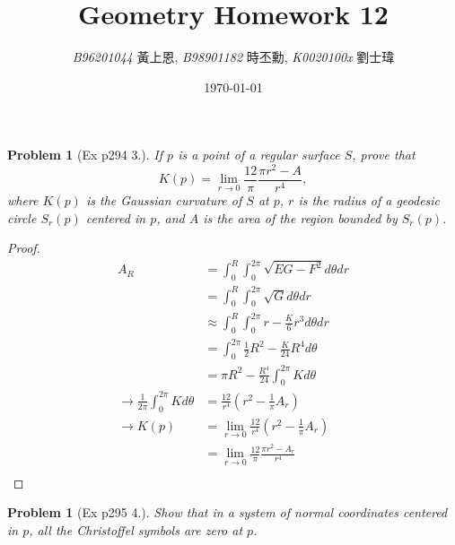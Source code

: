 \documentclass[10pt,a4paper]{article}
\newcommand{\LiHei}{\CJKfamily{lh}}
\newcounter{theProblemCounter}
\newtheorem{problem}[theProblemCounter]{Problem}
\begin{document}
\title{{Geometry Homework 12}}
\author{{\it{B96201044}} {\LiHei 黃上恩}, {\it{B98901182}} {\LiHei 時丕勳}, {\it{K0020100x}} {\LiHei 劉士瑋}}
\date{\today}
\maketitle

\newcommand{\bx}{\mathbb{X}}
\newcommand{\bfx}{\mathbf{x}}
\newcommand{\grad}{\textrm{grad }}
\newcommand{\sech}{\mbox{sech}}
\newcommand{\pr}[2]{\frac{\partial #1}{\partial #2}}
\newcommand{\prr}[3]{\frac{\partial^2 #1}{\partial #2\partial #3}}
\newcommand{\ip}[2]{\left\langle#1, #2\right\rangle}

\setcounter{theProblemCounter}{2}
\begin{problem}[Ex p294 3.]
If $p$ is a point of a regular surface $S$, prove that \[ K(p) = \lim_{r\to 0}\frac{12}{\pi}\frac{\pi r^2-A}{r^4}, \] where $K(p)$ is the Gaussian curvature of $S$ at $p$, $r$ is the radius of a geodesic circle $S_r(p)$ centered in $p$, and $A$ is the area of the region bounded by $S_r(p)$.
\end{problem}
\begin{proof}
\begin{align*}
A_R&=\int_{0}^{R}\int_0^{2\pi}\sqrt{EG-F^2}d\theta dr\\
&=\int_{0}^{R}\int_0^{2\pi}\sqrt{G}d\theta dr\\
&\approx \int_{0}^{R}\int_0^{2\pi} r-\frac{K}{6}r^3 d\theta dr\\
&=\int_0^{2\pi}\frac{1}{2}R^2-\frac{K}{24}R^4 d\theta\\
&=\pi R^2-\frac{R^4}{24}\int_0^{2\pi}K d\theta\\
\rightarrow \frac{1}{2\pi}\int_0^{2\pi}K d\theta &=\frac{12}{r^4}(r^2-\frac{1}{\pi}A_r)\\
\rightarrow K(p)&=\lim_{r\to 0}\frac{12}{r^4}(r^2-\frac{1}{\pi}A_r)\\
&=\lim_{r\to 0}\frac{12}{\pi}\frac{\pi r^2-A_r}{r^4}\\
\end{align*}
\end{proof}

\setcounter{theProblemCounter}{3}
\begin{problem}[Ex p295 4.]
Show that in a system of normal coordinates centered in $p$, all the Christoffel symbols are zero at $p$.
\end{problem}
\end{document}
